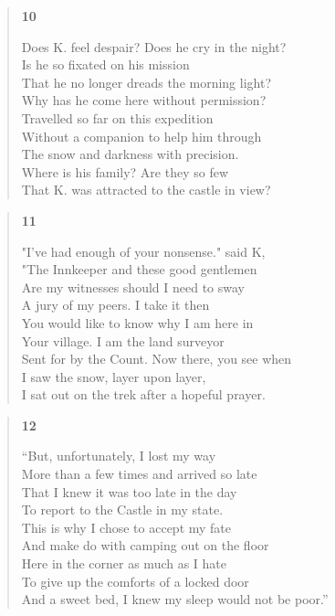 \documentclass{article}
\begin{document}
\begin{verse}
  \begin{center}
    \textbf{10} \\
  \end{center}
  Does K. feel despair? Does he cry in the night? \\
  Is he so fixated on his mission \\
  That he no longer dreads the morning light? \\
  Why has he come here without permission? \\
  Travelled so far on this expedition \\
  Without a companion to help him through \\
  The snow and darkness with precision. \\
  Where is his family? Are they so few \\
  That K. was attracted to the castle in view?
\end{verse}
\begin{verse}
  \begin{center}
    \textbf{11} \\
  \end{center}
  "I've had enough of your nonsense." said K, \\
  "The Innkeeper and these good gentlemen \\
  Are my witnesses should I need to sway \\
  A jury of my peers. I take it then \\
  You would like to know why I am here in \\
  Your village. I am the land surveyor \\
  Sent for by the Count. Now there, you see when \\
  I saw the snow, layer upon layer, \\
  I sat out on the trek after a hopeful prayer.
\end{verse}
\newpage
\begin{verse}
  \begin{center}
    \textbf{12} \\
  \end{center}
  ``But, unfortunately, I lost my way \\
  More than a few times and arrived so late \\
  That I knew it was too late in the day \\
  To report to the Castle in my state. \\
  This is why I chose to accept my fate \\
  And make do with camping out on the floor \\
  Here in the corner as much as I hate \\
  To give up the comforts of a locked door \\
  And a sweet bed, I knew my sleep would not be poor.''
\end{verse}
\end{document}
